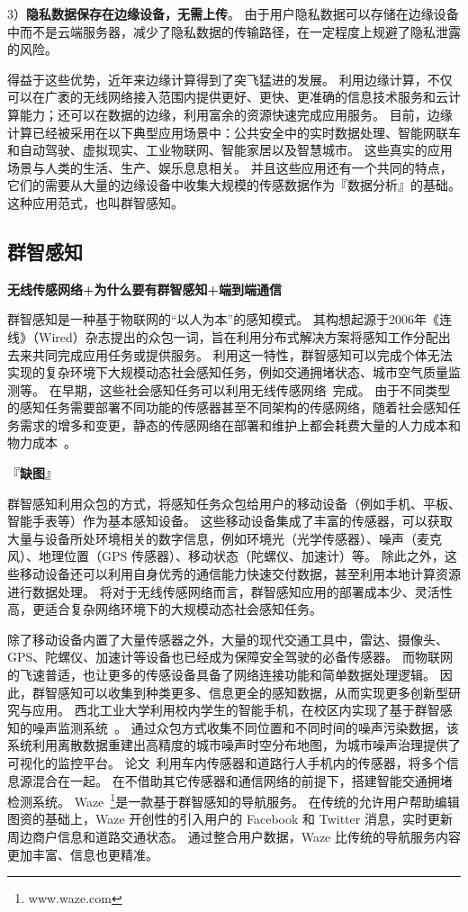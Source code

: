 3）\textbf{隐私数据保存在边缘设备，无需上传}。
由于用户隐私数据可以存储在边缘设备中而不是云端服务器，减少了隐私数据的传输路径，在一定程度上规避了隐私泄露的风险。

得益于这些优势，近年来边缘计算得到了突飞猛进的发展。
利用边缘计算，不仅可以在广袤的无线网络接入范围内提供更好、更快、更准确的信息技术服务和云计算能力；还可以在数据的边缘，利用富余的资源快速完成应用服务。
目前，边缘计算已经被采用在以下典型应用场景中：公共安全中的实时数据处理、智能网联车和自动驾驶、虚拟现实、工业物联网、智能家居以及智慧城市。
这些真实的应用场景与人类的生活、生产、娱乐息息相关。
并且这些应用还有一个共同的特点，它们的需要从大量的边缘设备中收集大规模的传感数据作为『数据分析』的基础。这种应用范式，也叫群智感知。

\subsection{群智感知}

\textbf{无线传感网络+为什么要有群智感知+端到端通信}

群智感知是一种基于物联网的“以人为本”的感知模式。
其构想起源于2006年《连线》（Wired）杂志提出的众包一词，旨在利用分布式解决方案将感知工作分配出去来共同完成应用任务或提供服务。
利用这一特性，群智感知可以完成个体无法实现的复杂环境下大规模动态社会感知任务，例如交通拥堵状态、城市空气质量监测等。
在早期，这些社会感知任务可以利用无线传感网络~\cite{DBLP:journals/cn/AkyildizSSC02}完成。
由于不同类型的感知任务需要部署不同功能的传感器甚至不同架构的传感网络，随着社会感知任务需求的增多和变更，静态的传感网络在部署和维护上都会耗费大量的人力成本和物力成本~\cite{CNKI/2006/WSNRen}。

『\textbf{缺图}』

群智感知利用众包的方式，将感知任务众包给用户的移动设备（例如手机、平板、智能手表等）作为基本感知设备。
这些移动设备集成了丰富的传感器，可以获取大量与设备所处环境相关的数字信息，例如环境光（光学传感器）、噪声（麦克风）、地理位置（GPS 传感器）、移动状态（陀螺仪、加速计）等。
除此之外，这些移动设备还可以利用自身优秀的通信能力快速交付数据，甚至利用本地计算资源进行数据处理。
将对于无线传感网络而言，群智感知应用的部署成本少、灵活性高，更适合复杂网络环境下的大规模动态社会感知任务。

除了移动设备内置了大量传感器之外，大量的现代交通工具中，雷达、摄像头、GPS、陀螺仪、加速计等设备也已经成为保障安全驾驶的必备传感器。
而物联网的飞速普适，也让更多的传感设备具备了网络连接功能和简单数据处理逻辑。
因此，群智感知可以收集到种类更多、信息更全的感知数据，从而实现更多创新型研究与应用。
西北工业大学利用校内学生的智能手机，在校区内实现了基于群智感知的噪声监测系统~\cite{CNKI/2014/CSNSYu}。
通过众包方式收集不同位置和不同时间的噪声污染数据，该系统利用离散数据重建出高精度的城市噪声时空分布地图，为城市噪声治理提供了可视化的监控平台。
论文~\cite{DBLP:conf/wcnc/AliAEJH12}利用车内传感器和道路行人手机内的传感器，将多个信息源混合在一起。
在不借助其它传感器和通信网络的前提下，搭建智能交通拥堵检测系统。
Waze~\footnote{www.waze.com}是一款基于群智感知的导航服务。
在传统的允许用户帮助编辑图资的基础上，Waze 开创性的引入用户的 Facebook 和 Twitter 消息，实时更新周边商户信息和道路交通状态。
通过整合用户数据，Waze 比传统的导航服务内容更加丰富、信息也更精准。


